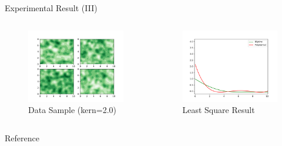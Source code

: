 \documentclass[
  ignorenonframetext,
  aspectratio=169,
  serif,onlymath]{beamer}
\newif\ifbibliography
\begin{document}
\begin{frame}{Experimental Result (III)}
\protect\hypertarget{experimental-result-iii}{}

\begin{columns}

\begin{figure}
\centering
\includegraphics{ellipsoid.files/iso200.pdf}
\caption{Data Sample (kern=2.0)}
\end{figure}


\begin{figure}
\centering
\includegraphics{ellipsoid.files/result200.pdf}
\caption{Least Square Result}
\end{figure}

\end{columns}

\end{frame}

\renewcommand\refname{Reference}
\begin{frame}[allowframebreaks]{Reference}
  \bibliographytrue
  
\end{frame}
\end{document}
